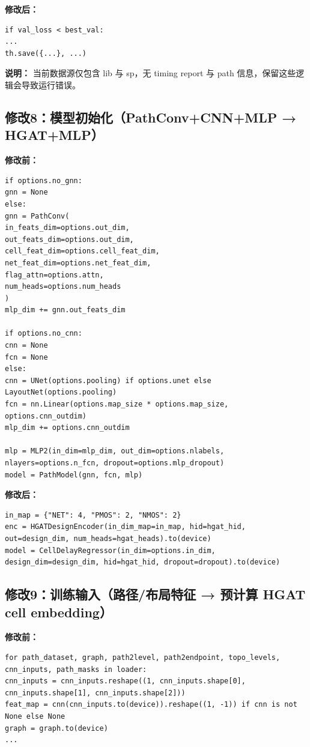 \documentclass[11pt]{article}
\begin{document}
\textbf{修改后：}
\begin{lstlisting}
if val_loss < best_val:
...
th.save({...}, ...)
\end{lstlisting}

\textbf{说明：} 当前数据源仅包含 lib 与 sp，无 timing report 与 path 信息，保留这些逻辑会导致运行错误。

\subsection*{修改8：模型初始化（PathConv+CNN+MLP → HGAT+MLP）}
\textbf{修改前：}
\begin{lstlisting}
if options.no_gnn:
gnn = None
else:
gnn = PathConv(
in_feats_dim=options.out_dim,
out_feats_dim=options.out_dim,
cell_feat_dim=options.cell_feat_dim,
net_feat_dim=options.net_feat_dim,
flag_attn=options.attn,
num_heads=options.num_heads
)
mlp_dim += gnn.out_feats_dim

if options.no_cnn:
cnn = None
fcn = None
else:
cnn = UNet(options.pooling) if options.unet else LayoutNet(options.pooling)
fcn = nn.Linear(options.map_size * options.map_size, options.cnn_outdim)
mlp_dim += options.cnn_outdim

mlp = MLP2(in_dim=mlp_dim, out_dim=options.nlabels, nlayers=options.n_fcn, dropout=options.mlp_dropout)
model = PathModel(gnn, fcn, mlp)
\end{lstlisting}

\textbf{修改后：}
\begin{lstlisting}
in_map = {"NET": 4, "PMOS": 2, "NMOS": 2}
enc = HGATDesignEncoder(in_dim_map=in_map, hid=hgat_hid, out=design_dim, num_heads=hgat_heads).to(device)
model = CellDelayRegressor(in_dim=options.in_dim, design_dim=design_dim, hid=hgat_hid, dropout=dropout).to(device)
\end{lstlisting}


\subsection*{修改9：训练输入（路径/布局特征 → 预计算 HGAT cell embedding）}
\textbf{修改前：}
\begin{lstlisting}
for path_dataset, graph, path2level, path2endpoint, topo_levels, cnn_inputs, path_masks in loader:
cnn_inputs = cnn_inputs.reshape((1, cnn_inputs.shape[0], cnn_inputs.shape[1], cnn_inputs.shape[2]))
feat_map = cnn(cnn_inputs.to(device)).reshape((1, -1)) if cnn is not None else None
graph = graph.to(device)
...
\end{lstlisting}
\end{document}
